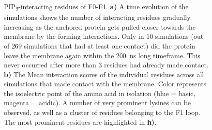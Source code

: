 \documentclass[
  letterpaper,
  DIV=11,
  numbers=noendperiod]{scrartcl}
\begin{document}
\begin{figure}

\begin{minipage}[t]{\linewidth}

{\centering 


}

\subcaption{\label{fig-f0f1-ri-npip}~}
\end{minipage}%
\newline
\begin{minipage}[t]{\linewidth}

{\centering 


}

\end{minipage}%

\caption{\label{fig-f0f1-residues}PIP\textsubscript{2}-interacting
residues of F0-F1. \textbf{a)} A time evolution of the simulations shows
the number of interacting residues gradually increasing as the anchored
protein gets pulled closer towards the membrane by the forming
interactions. Only in 10 simulations (out of 269 simulations that had at
least one contact) did the protein leave the membrane again within the
200~ns long timeframe. This never occurred after more than 3 residues
had already made contact. \textbf{b)} The Mean interaction scores of the
individual residues across all simulations that made contact with the
membrane. Color represents the isoelectric point of the amino acid in
isolation (blue = basic, magenta = acidic). A number of very prominent
lysines can be observed, as well as a cluster of residues belonging to
the F1 loop. The most prominent residues are highlighted in
\textbf{h)}.}


\end{figure}
\end{document}
